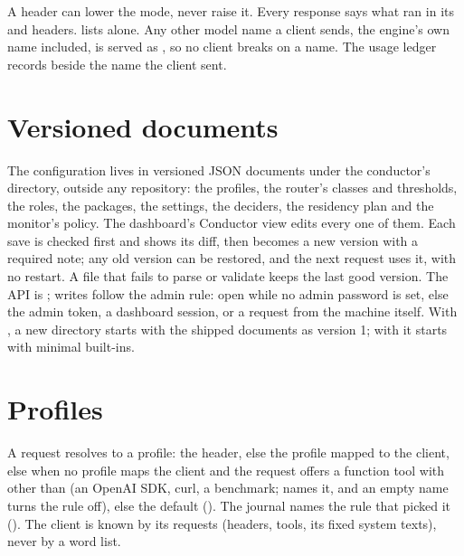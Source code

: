 A header can lower the mode, never raise it. Every response says what ran in its  and  headers.  lists  alone. Any other model name a client sends, the engine's own name included, is served as , so no client breaks on a name. The usage ledger records  beside the name the client sent.

\section{Versioned documents}

The configuration lives in versioned JSON documents under the conductor's directory, outside any repository: the profiles, the router's classes and thresholds, the roles, the packages, the settings, the deciders, the residency plan and the monitor's policy. The dashboard's Conductor view edits every one of them. Each save is checked first and shows its diff, then becomes a new version with a required note; any old version can be restored, and the next request uses it, with no restart. A file that fails to parse or validate keeps the last good version. The API is ; writes follow the admin rule: open while no admin password is set, else the admin token, a dashboard session, or a request from the machine itself. With , a new directory starts with the shipped documents as version 1; with  it starts with minimal built-ins.

\section{Profiles}\label{sec:profiles}

A request resolves to a profile: the  header, else the profile mapped to the client, else  when no profile maps the client and the request offers a function tool with  other than  (an OpenAI SDK, curl, a benchmark;  names it, and an empty name turns the rule off), else the default (). The journal names the rule that picked it (). The client is known by its requests (headers, tools, its fixed system texts), never by a word list.

